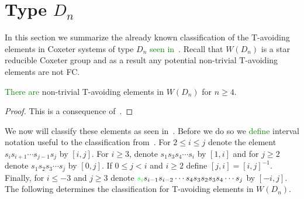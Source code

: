 
\section{Type $D_n$}

In this section we summarize the already known classification of the T-avoiding elements in Coxeter systems of type $D_n$ \textcolor{green}{seen in~\cite{Gern2013a}}. Recall that $W(D_n)$ is a star reducible Coxeter group and as a result any potential non-trivial T-avoiding elements are not FC.

\begin{proposition}
 \textcolor{green}{There are} non-trivial T-avoiding elements in $W(D_n)$ for $n \geq 4$.
\begin{proof}
	This is a consequence of~\cite[Section 2.2]{Gern2013a}. 
\end{proof}
\end{proposition}

We now will classify these elements as seen in~\cite{Gern2013a}. Before we do so we \textcolor{green}{define} interval notation useful to the classification from~\cite[Definition 2.3.1]{Gern2013a}. For $2 \leq i \leq j$ denote the element $s_{i}s_{i+1} \cdots s_{j-1}s_j$ by $[i,j]$. For $i \geq 3$, denote $s_1s_3s_4\cdots s_i$ by $[1,i]$ and for $j \geq 2$ denote $s_1s_2s_3 \cdots s_j$ by $[0,j]$. If $0 \leq j <i$ and $i \geq 2$ define $[j,i]=[i,j]^{-1}$. Finally, for $i \leq -3$ and $j \geq 3$ denote $\textcolor{green}{s_i}s_{i-1}s_{i-2} \cdots s_4s_3s_2s_3s_4 \cdots s_j$ by $[-i,j]$. The following determines the classification for T-avoiding elements in $W(D_n)$. 

